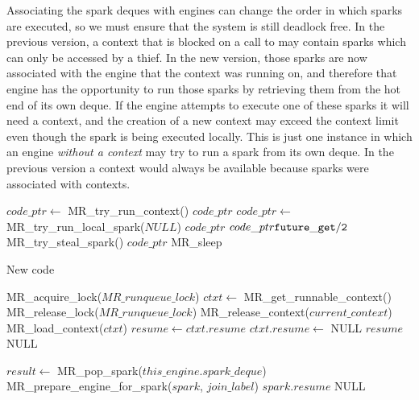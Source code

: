 Associating the spark deques with engines can change the order in which
sparks are executed,
so we must ensure that the system is still deadlock free.
In the previous version,
a context that is blocked on a call to \wait may contain sparks
which can only be accessed by a thief.
In the new version,
those sparks are now associated with the engine that the context was running
on,
and therefore that engine has the opportunity to run those sparks by
retrieving them from the hot end of its own deque.
If the engine attempts to execute one of these sparks it will need a
context,
and the creation of a new context may exceed the context limit even though
the spark is being executed locally.
This is just one instance in which an engine \emph{without a context}
may try to run a spark from its own deque.
In the previous version a context would always be available because sparks
were associated with contexts.

\begin{algorithm}[tbp]
\begin{algorithmic}
        \State $code\_ptr \gets$ MR\_try\_run\_context()
            \Goto $code\_ptr$
        \EndIf
        \State $code\_ptr \gets$ MR\_try\_run\_local\_spark($NULL$)
            \Goto $code\_ptr$
        \EndIf
        \State $code\_ptr {\tt future\_get/2}$ MR\_try\_steal\_spark()
            \Goto $code\_ptr$
        \EndIf
        \Goto MR\_sleep
    \EndProcedure
\end{algorithmic}
\caption{New \idle code}
\label{alg:idle_entry_point}
\end{algorithm}

\begin{algorithm}
\begin{algorithmic}
    \State MR\_acquire\_lock($MR\_runqueue\_lock$)
    \State $ctxt \gets$ MR\_get\_runnable\_context()
    \State MR\_release\_lock($MR\_runqueue\_lock$)
            \State MR\_release\_context($current\_context$)
        \EndIf
        \State MR\_load\_context($ctxt$)
        \State $resume \gets ctxt.resume$
        \State $ctxt.resume \gets$ NULL
        \State \Return $resume$
    \Else
        \State \Return NULL
    \EndIf
\EndProcedure
\end{algorithmic}
\end{algorithm}

\begin{algorithm}
\begin{algorithmic}
    \State $result \gets$ MR\_pop\_spark($this\_engine.spark\_deque$)
        \State MR\_prepare\_engine\_for\_spark($spark$, $join\_label$)
        \State \Return $spark.resume$
    \Else
        \State \Return NULL
    \EndIf
\EndProcedure
\end{algorithmic}
\end{algorithm}

